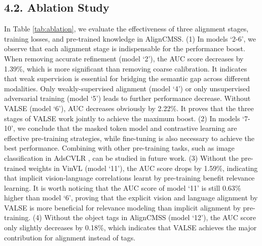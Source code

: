 \documentclass[letterpaper]{article} \usepackage{aaai24}  \usepackage{times}  \usepackage{helvet}  \usepackage{courier}  \usepackage[hyphens]{url}  \usepackage{graphicx} \urlstyle{rm} \def\UrlFont{\rm}  \usepackage{natbib}  \usepackage{caption} \frenchspacing  \setlength{\pdfpagewidth}{8.5in}  \setlength{\pdfpageheight}{11in}
\begin{document}
\subsection{4.2. Ablation Study}
In Table \ref{tab:ablation}, we evaluate the effectiveness of three alignment stages, training losses, and pre-trained knowledge in AlignCMSS. (1) In models ‘2-6’, we observe that each alignment stage is indispensable for the performance boost. When removing accurate refinement (model ‘2’), the AUC score decreases by 1.39\%, which is more significant than removing coarse calibration. It indicates that weak supervision is essential for bridging the semantic gap across different modalities. Only weakly-supervised alignment (model ‘4’) or only unsupervised adversarial training (model `5') leads to further performance decrease. Without VALSE (model `6'), AUC decreases obviously by 2.22\%. It proves that the three stages of VALSE work jointly to achieve the maximum boost. (2) In models ‘7-10’, we conclude that the masked token model and contrastive learning are effective pre-training strategies, while fine-tuning is also necessary to achieve the best performance. Combining with other pre-training tasks, such as image classification in AdsCVLR \cite{10.1145/3503161.3548226}, can be studied in future work. (3) Without the pre-trained weights in VinVL (model ‘11’),  the AUC score drops by 1.59\%, indicating that implicit vision-language correlations learnt by pre-training benefit relevance learning. 
It is worth noticing that the AUC score of model ‘11’ is still 0.63\% higher than model `6’, proving that the explicit vision and language alignment by VALSE is more beneficial for relevance modeling than implicit alignment by pre-training. (4) Without the object tags in AlignCMSS (model ‘12’), the AUC score only slightly decreases by 0.18\%, which indicates that VALSE achieves the major contribution for alignment instead of tags. 
\end{document}
